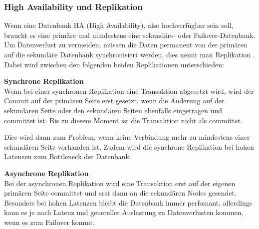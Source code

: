 
\clearpage
\subsubsection{High Availability und Replikation}
\begin{flushleft}
    Wenn eine Datenbank HA (High Availability), also hochverfügbar sein soll, braucht es eine primäre und mindestens eine sekundäre- oder \Gls{Failover}-Datenbank.
    Um Datenverlust zu vermeiden, müssen die Daten permanent von der primären auf die sekundäre Datenbank synchronisiert werden, dies nennt man Replikation \cite{D9RDXENY}.
    Dabei wird zwischen den folgenden beiden Replikationen unterschieden:
\end{flushleft}
\begin{flushleft}
    \textbf{Synchrone Replikation}\\
    Wenn bei einer synchronen Replikation eine Transaktion abgesetzt wird, wird der Commit auf der primären Seite erst gesetzt, wenn die Änderung auf der sekundären Seite oder den sekundären Seiten ebenfalls eingetragen und committet ist.
    Bis zu diesem Moment ist die Transaktion nicht als committet.
    
    Dies wird dann zum Problem, wenn keine Verbindung mehr zu mindestens einer sekundären Seite vorhanden ist.
    Zudem wird die synchrone Replikation bei hohen Latenzen zum Bottleneck der Datenbank.
\end{flushleft}
\begin{flushleft}
    \textbf{Asynchrone Replikation}\\
    Bei der asynchronen Replikation wird eine Transaktion erst auf der eigenen primären Seite committet und erst dann an die sekundären Nodes gesendet.
    Besonders bei hohen Latenzen bleibt die Datenbank immer perfomant, allerdings kann es je nach Latenz und genereller Auslastung zu Datenverlusten kommen, wenn es zum \Gls{Failover} kommt.
\end{flushleft}